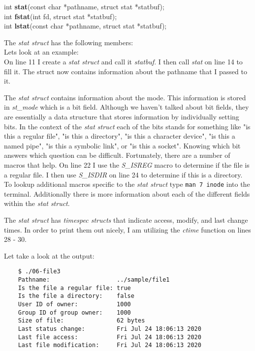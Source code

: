 \documentclass[../main.tex]{subfiles}
\begin{document}
	int \textbf{stat}(const char *pathname, struct stat *statbuf);\\
	int \textbf{fstat}(int fd, struct stat *statbuf);\\
	int \textbf{lstat}(const char *pathname, struct stat *statbuf);

	The \textit{stat struct} has the following members:\\
	
	
	
	Lets look at an example:\\
	
	
	
	On line 11 I create a \textit{stat struct} and call it \textit{statbuf}.  I then call \textit{stat} on line 14 to fill it.  The struct now contains information about the pathname that I passed to it.
	
	The \textit{stat struct} contains information about the mode.  This information is stored in \textit{st\_mode} which is a bit field.  Although we haven't talked about bit fields, they are essentially a data structure that stores information by individually setting bits.  In the context of the \textit{stat struct} each of the bits stands for something like "is this a regular file", "is this a directory", "is this a character device", "is this a named pipe", "is this a symbolic link", or "is this a socket".  Knowing which bit answers which question can be difficult.  Fortunately, there are a number of macros that help.  On line 22 I use the \textit{S\_ISREG} macro to determine if the file is a regular file.  I then use \textit{S\_ISDIR} on line 24 to determine if this is a directory.  To lookup additional macros specific to the \textit{stat struct} type \texttt{man 7 inode} into the terminal.  Additionally there is more information about each of the different fields within the \textit{stat struct}.
	
	The \textit{stat struct} has \textit{timespec structs} that indicate access, modify, and last change times.  In order to print them out nicely, I am utilizing the \textit{ctime} function on lines 28 - 30.
	
	Let take a look at the output:
 	
	\begin{verbatim}
	$ ./06-file3
	Pathname:                   ../sample/file1
	Is the file a regular file: true
	Is the file a directory:    false
	User ID of owner:           1000
	Group ID of group owner:    1000
	Size of file:               62 bytes
	Last status change:         Fri Jul 24 18:06:13 2020
	Last file access:           Fri Jul 24 18:06:13 2020
	Last file modification:     Fri Jul 24 18:06:13 2020
	\end{verbatim}
	
\end{document}

